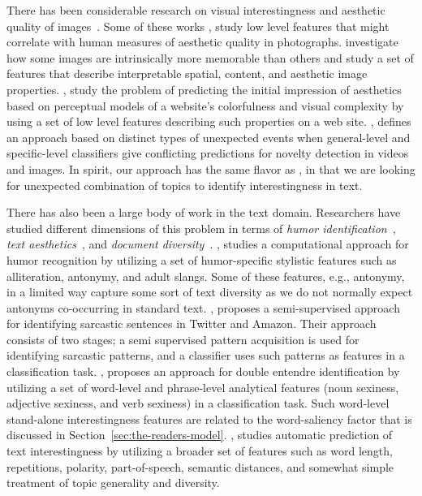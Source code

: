 There has been considerable research on visual interestingness and aesthetic quality of images~\cite{Datta:2006:SAP:2129560.2129588,Datta:2008:4233023,Ke:2006:DHF:1153170.1153495,IsolaParikhTorralbaOliva2011,dhar:2011,reinecke2013predicting,journals/pami/WeinshallZHKOABGNPHP12}. Some of these works \cite{Datta:2006:SAP:2129560.2129588,Datta:2008:4233023,Ke:2006:DHF:1153170.1153495,dhar:2011}, study low level features that might correlate with human measures of aesthetic quality in photographs. \cite{IsolaParikhTorralbaOliva2011} investigate how some images are intrinsically more memorable than others and study a set of features that describe interpretable spatial, content, and aesthetic image properties. \cite{reinecke2013predicting,journals/pami/WeinshallZHKOABGNPHP12},  study the problem of predicting the initial impression of aesthetics
based on perceptual models of a website's colorfulness and visual complexity by using a set of low level features describing such properties on a web site.  
\cite{journals/pami/WeinshallZHKOABGNPHP12}, defines an approach based on distinct types of unexpected events when general-level and specific-level classifiers give conflicting predictions for novelty detection in videos and images. In spirit, our approach has the same flavor as \cite{journals/pami/WeinshallZHKOABGNPHP12},  in that we are looking for unexpected combination of topics to identify interestingness in text.

 
There has also been a large body of work in the text domain. Researchers have studied different dimensions of this problem in terms of {\em humor identification}~\cite{Mihalcea:2005:MCL:1220575.1220642,Davidov:2010:SRS:1870568.1870582,Kiddon11,labutov-lipson:2012:ACL2012short},
{\em text aesthetics}~\cite{journals:tamd:Schmidhuber10,N13-1118,ganguly:2014}, and {\em document diversity}~\cite{bache:2013}.  \cite{Mihalcea:2005:MCL:1220575.1220642}, studies a computational approach for humor recognition by utilizing a set of humor-specific stylistic features such as alliteration, antonymy, and adult slangs. Some of these features, e.g., antonymy, in a limited way capture some sort of text diversity as we do not normally expect antonyms co-occurring in standard text. \cite{Davidov:2010:SRS:1870568.1870582},  proposes a semi-supervised approach for identifying sarcastic sentences
in Twitter and Amazon.  Their approach consists of two stages; a semi supervised pattern acquisition is used for identifying
sarcastic patterns, and a classifier uses such patterns as features in a classification task. \cite{Kiddon11}, proposes an approach for double entendre identification by utilizing  a set of word-level and phrase-level analytical features (noun sexiness, adjective sexiness, and verb sexiness) in a classification task. Such word-level stand-alone interestingness features are related to the word-saliency factor that is discussed in Section~\ref{sec:the-readers-model}. \cite{ganguly:2014}, studies automatic prediction of text interestingness by utilizing a broader set of features such as word length, repetitions, polarity, part-of-speech, semantic distances, and somewhat simple treatment of topic generality and diversity.


